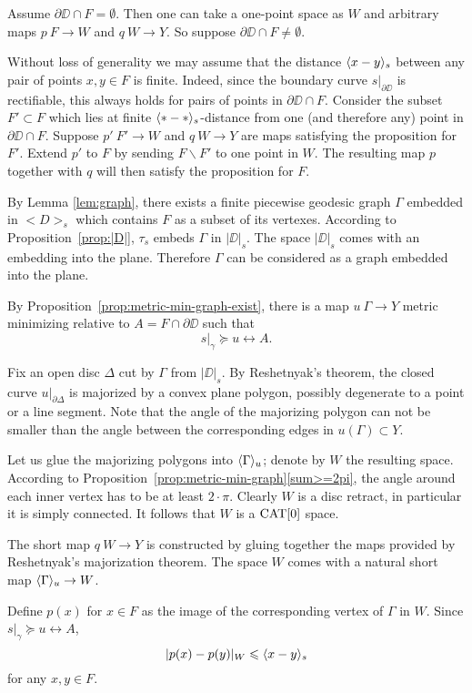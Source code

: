  Assume $\partial \DD\cap F= \emptyset$.
Then one can take a one-point space as $W$ and arbitrary maps $p\:F\to W$ and $q\:W\to Y$.
So suppose $\partial \DD\cap F\ne\emptyset$.

Without loss of generality we may assume that the distance $\langle x-y\rangle_s$
between any pair of points $x,y\in F$ is finite.
Indeed, since the boundary curve $s|_{\partial\DD}$ is rectifiable,
this always holds for pairs of points in $\partial \DD\cap F$.
Consider the subset $F'\subset F$ which lies at finite $\langle{*}-{*}\rangle_s$-distance from one (and therefore any) point in $\partial \DD\cap F$.
Suppose $p'\:F'\to W$ and $q\:W\to Y$ are maps satisfying the proposition for $F'$.
Extend $p'$ to $F$ by sending $F\backslash F'$ to one point in $W$. The resulting
map $p$ together with $q$ will then satisfy the proposition for $F$.

By Lemma \ref{lem:graph}, there exists a finite piecewise geodesic graph $\Gamma$ embedded in $<D>_s$ which
contains $F$ as a subset of its vertexes.
According to Proposition~\ref{prop:|D|},
 $\tau_s$ embeds $\Gamma$ in $|\DD|_s$.
The space $|\DD|_s$ comes with an embedding into the plane.
Therefore $\Gamma$ can be considered as a graph embedded into the plane.

By Proposition~\ref{prop:metric-min-graph-exist}, there is a map 
$u\:\Gamma\to Y$ metric minimizing relative to $A=F\cap\partial\DD$ such that
\[s|_\gamma\succcurlyeq u\rel A.\]

Fix an open disc $\Delta$ cut by $\Gamma$ from $|\DD|_s$.
By Reshetnyak's theorem, the closed curve $u|_{\partial\Delta}$
is majorized by a convex plane polygon, possibly degenerate to a point or a line segment.
Note that the angle of the majorizing polygon can not be smaller than the angle between the corresponding edges in $u(\Gamma)\subset Y$.

Let us glue the majorizing polygons into $\langle\Gamma\rangle_u$;
denote by $W$ the resulting space.
According to Proposition~\ref{prop:metric-min-graph}\ref{sum>=2pi}, the angle around each inner vertex has to be at least $2\cdot\pi$.
Clearly $W$ is a disc retract, in particular it is simply connected.
It follows that $W$ is a $\mathop{\rm CAT}\nolimits[0]$ space.

The short map $q\:W\to Y$ is constructed by gluing together the maps provided by Reshetnyak's majorization theorem.
The space $W$ comes with a natural short map $\langle\Gamma\rangle_u\to W$.

Define $p(x)$ for $x\in F$ as the image of the corresponding vertex of $\Gamma$ in $W$.
Since $s|_\gamma\succcurlyeq u\rel A$, 
\[|p(x)-p(y)|_W\leqslant \langle x-y\rangle_s\]
for any $x,y\in F$.

